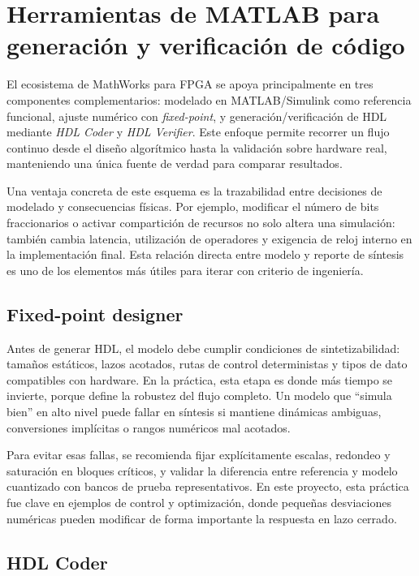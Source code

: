 \section{Herramientas de MATLAB para generación y verificación de código}

El ecosistema de MathWorks para FPGA se apoya principalmente en tres componentes complementarios: modelado en MATLAB/Simulink como referencia funcional, ajuste numérico con \textit{fixed-point}, y generación/verificación de HDL mediante \textit{HDL Coder} y \textit{HDL Verifier}. Este enfoque permite recorrer un flujo continuo desde el diseño algorítmico hasta la validación sobre hardware real, manteniendo una única fuente de verdad para comparar resultados.

Una ventaja concreta de este esquema es la trazabilidad entre decisiones de modelado y consecuencias físicas. Por ejemplo, modificar el número de bits fraccionarios o activar compartición de recursos no solo altera una simulación: también cambia latencia, utilización de operadores y exigencia de reloj interno en la implementación final. Esta relación directa entre modelo y reporte de síntesis es uno de los elementos más útiles para iterar con criterio de ingeniería.

\subsection{Fixed-point designer}

Antes de generar HDL, el modelo debe cumplir condiciones de sintetizabilidad: tamaños estáticos, lazos acotados, rutas de control deterministas y tipos de dato compatibles con hardware. En la práctica, esta etapa es donde más tiempo se invierte, porque define la robustez del flujo completo. Un modelo que ``simula bien'' en alto nivel puede fallar en síntesis si mantiene dinámicas ambiguas, conversiones implícitas o rangos numéricos mal acotados.

Para evitar esas fallas, se recomienda fijar explícitamente escalas, redondeo y saturación en bloques críticos, y validar la diferencia entre referencia y modelo cuantizado con bancos de prueba representativos. En este proyecto, esta práctica fue clave en ejemplos de control y optimización, donde pequeñas desviaciones numéricas pueden modificar de forma importante la respuesta en lazo cerrado.

\subsection{HDL Coder}


